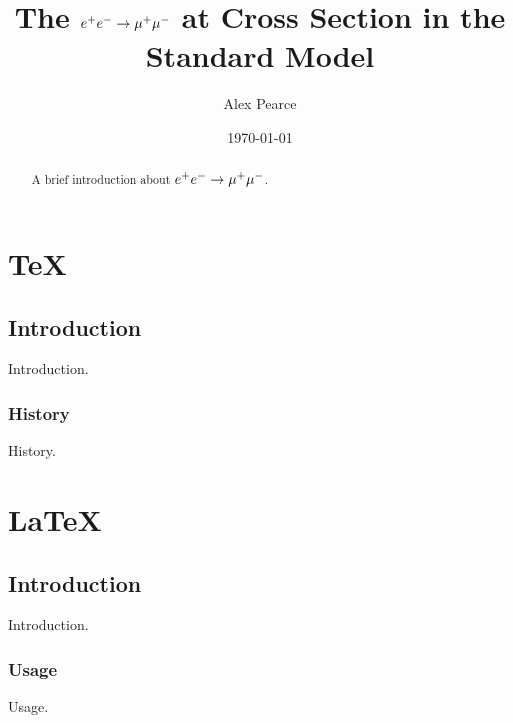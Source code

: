 \documentclass[]{report}
\begin{document}
\title{The $\ee \rarrow \mumu$ at Cross Section in the Standard Model}
\author{Alex Pearce}
\date{\today}
\maketitle

\begin{abstract}
  A brief introduction about $\ee \rarrow \mumu$.
\end{abstract}

\tableofcontents

\chapter{\TeX}

\section{Introduction}
Introduction.

\subsection{History}
History.

\chapter{\LaTeX}

\section{Introduction}
Introduction.

\subsection{Usage}
Usage.

\begin{thebibliography}{9}
\end{thebibliography}
\end{document}
